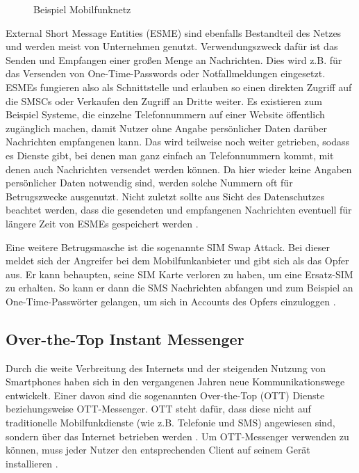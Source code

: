 \documentclass[conference]{IEEEtran}
\begin{document}
\begin{figure}
    \centerline{}
    \caption{Beispiel Mobilfunknetz \cite{sendoutsms}}
    \label{mobilfunknetz}
\end{figure}

External Short Message Entities (ESME) sind ebenfalls Bestandteil des Netzes und werden meist von Unternehmen genutzt.
Verwendungszweck dafür ist das Senden und Empfangen einer großen Menge an Nachrichten.
Dies wird z.B. für das Versenden von One-Time-Passwords oder Notfallmeldungen eingesetzt.
ESMEs fungieren also als Schnittstelle und erlauben so einen direkten Zugriff auf die SMSCs oder Verkaufen den Zugriff an Dritte weiter.
Es existieren zum Beispiel Systeme, die einzelne Telefonnummern auf einer Website öffentlich zugänglich machen, damit Nutzer ohne Angabe persönlicher Daten darüber Nachrichten empfangenen kann.
Das wird teilweise noch weiter getrieben, sodass es Dienste gibt, bei denen man ganz einfach an Telefonnummern kommt, mit denen auch Nachrichten versendet werden können.
Da hier wieder keine Angaben persönlicher Daten notwendig sind, werden solche Nummern oft für Betrugszwecke ausgenutzt.
Nicht zuletzt sollte aus Sicht des Datenschutzes beachtet werden, dass die gesendeten und empfangenen Nachrichten eventuell für längere Zeit von ESMEs gespeichert werden \cite{sendoutsms}.

Eine weitere Betrugsmasche ist die sogenannte SIM Swap Attack.
Bei dieser meldet sich der Angreifer bei dem Mobilfunkanbieter und gibt sich als das Opfer aus.
Er kann behaupten, seine SIM Karte verloren zu haben, um eine Ersatz-SIM zu erhalten.
So kann er dann die SMS Nachrichten abfangen und zum Beispiel an One-Time-Passwörter gelangen, um sich in Accounts des Opfers einzuloggen \cite{sendoutsms}.


\subsection{Over-the-Top Instant Messenger}

Durch die weite Verbreitung des Internets und der steigenden Nutzung von Smartphones haben sich in den vergangenen Jahren neue Kommunikationswege entwickelt.
Einer davon sind die sogenannten Over-the-Top (OTT) Dienste beziehungsweise OTT-Messenger.
OTT steht dafür, dass diese nicht auf traditionelle Mobilfunkdienste (wie z.B. Telefonie und SMS) angewiesen sind, sondern über das Internet betrieben werden \cite{ottbund}.
Um OTT-Messenger verwenden zu können, muss jeder Nutzer den entsprechenden Client auf seinem Gerät installieren \cite{rcsmno}.
\end{document}
